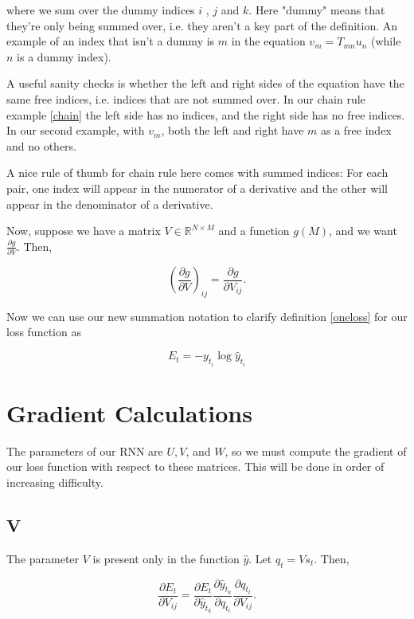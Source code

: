 \documentclass[11pt,twoside]{article}
\begin{document}
\noindent where we sum over the dummy indices $i$ , $j$ and $k$. Here "dummy" means that they're only being summed over, i.e. they aren't a key part of the definition. An example of an index that isn't a dummy is $m$ in the equation $v_m=T_{m n} u_n$ (while $n$ is a dummy index).

A useful sanity checks is whether the left and right sides of the equation have the same free indices, i.e. indices that are not summed over. In our chain rule example \eqref{chain} the left side has no indices, and the right side has no free indices. In our second example, with $v_m$, both the left and right have $m$ as a free index and no others.

A nice rule of thumb for chain rule here comes with summed indices: For each pair, one index will appear in the numerator of a derivative and the other will appear in the denominator of a derivative.

Now, suppose we have a matrix $V\in\mathbb{R}^{N\times M}$ and a function $g(M)$, and we want $\frac{\partial g}{\partial V}$. Then,

\begin{equation}
\label{matcalc}
\left( \frac{\partial g}{\partial V}\right)_{i j}=\frac{\partial g}{\partial V_{i j}}.
\end{equation}

\noindent Now we can use our new summation notation to clarify definition \eqref{oneloss} for our loss function as

\begin{equation}
\label{einloss}
E_t=-y_{t_i}\log{\hat{y}_{t_i}}
\end{equation}

\section{Gradient Calculations}
The parameters of our RNN are $U, V$, and $W$, so we must compute the gradient of our loss function with respect to these matrices. This will be done in order of increasing difficulty.

\subsection{V}
The parameter $V$ is present only in the function $\hat{y}$. Let $q_t=V s_t$. Then,

\begin{equation}
\frac{\partial E_t}{\partial V_{i j}}=\frac{\partial E_t}{\partial \hat{y}_{t_k}}\frac{\partial \hat{y}_{t_k}}{\partial q_{t_l}}\frac{\partial q_{t_l}}{\partial  V_{i j}}.
\end{equation}
\end{document}
